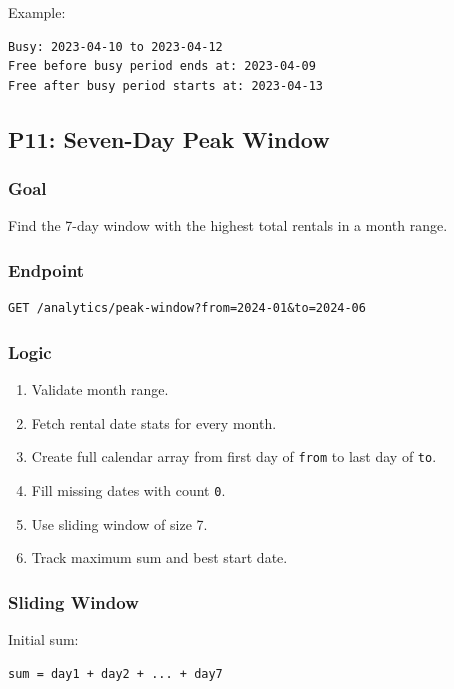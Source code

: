 \documentclass[11pt,a4paper]{article}
\begin{document}
Example:

\begin{lstlisting}
Busy: 2023-04-10 to 2023-04-12
Free before busy period ends at: 2023-04-09
Free after busy period starts at: 2023-04-13
\end{lstlisting}

\subsection{P11: Seven-Day Peak Window}

\subsubsection*{Goal}
Find the 7-day window with the highest total rentals in a month range.

\subsubsection*{Endpoint}

\begin{lstlisting}
GET /analytics/peak-window?from=2024-01&to=2024-06
\end{lstlisting}

\subsubsection*{Logic}

\begin{enumerate}
  \item Validate month range.
  \item Fetch rental date stats for every month.
  \item Create full calendar array from first day of \texttt{from} to last day of \texttt{to}.
  \item Fill missing dates with count \texttt{0}.
  \item Use sliding window of size 7.
  \item Track maximum sum and best start date.
\end{enumerate}

\subsubsection*{Sliding Window}

Initial sum:

\begin{lstlisting}
sum = day1 + day2 + ... + day7
\end{lstlisting}
\end{document}

